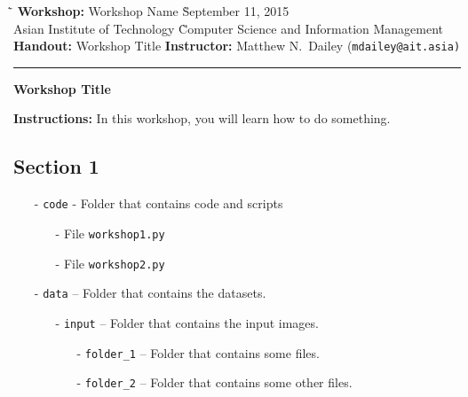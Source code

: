 \documentclass{article}
\begin{document}
\begin{tabbing}
    \`\=\kill
    \textbf{Workshop:} Workshop Name
    \` September 11, 2015 \\
    Asian Institute of Technology
    \` Computer Science and Information Management \\
    \textbf{Handout:} Workshop Title
    \` \textbf{Instructor:} Matthew N.\ Dailey (\tt{\small mdailey@ait.asia})
\end{tabbing}

\hrule

\vspace{.25in}

\begin{center}
    \textbf{\Large Workshop Title}
\end{center}

\vspace{.15in}

\noindent \textbf{Instructions:} In this workshop, you will learn how to do something.


\subsection*{Section 1}

\begin{itemize}
    \item[-] {\tt code} - Folder that contains code and scripts
    \begin{itemize}
        \item[-] File {\tt workshop1.py}
        \item[-] File {\tt workshop2.py}
    \end{itemize}
    \item[-] {\tt data} -- Folder that contains the datasets.
    \begin{itemize}
        \item[-] {\tt input} -- Folder that contains the input images.
        \begin{itemize}
            \item[-] {\tt folder\_1} -- Folder that contains some files.
            \item[-] {\tt folder\_2} -- Folder that contains some other files.
        \end{itemize}
    \end{itemize}
\end{itemize}
\end{document}
